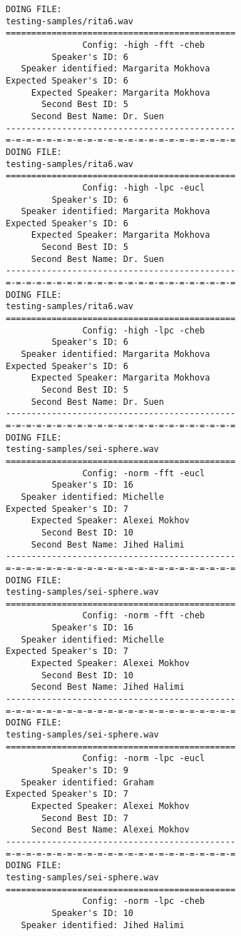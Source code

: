 \begin{verbatim}
DOING FILE:
testing-samples/rita6.wav
=============================================
               Config: -high -fft -cheb
         Speaker's ID: 6
   Speaker identified: Margarita Mokhova
Expected Speaker's ID: 6
     Expected Speaker: Margarita Mokhova
       Second Best ID: 5
     Second Best Name: Dr. Suen
---------------------------------------------
=-=-=-=-=-=-=-=-=-=-=-=-=-=-=-=-=-=-=-=-=-=-=
DOING FILE:
testing-samples/rita6.wav
=============================================
               Config: -high -lpc -eucl
         Speaker's ID: 6
   Speaker identified: Margarita Mokhova
Expected Speaker's ID: 6
     Expected Speaker: Margarita Mokhova
       Second Best ID: 5
     Second Best Name: Dr. Suen
---------------------------------------------
=-=-=-=-=-=-=-=-=-=-=-=-=-=-=-=-=-=-=-=-=-=-=
DOING FILE:
testing-samples/rita6.wav
=============================================
               Config: -high -lpc -cheb
         Speaker's ID: 6
   Speaker identified: Margarita Mokhova
Expected Speaker's ID: 6
     Expected Speaker: Margarita Mokhova
       Second Best ID: 5
     Second Best Name: Dr. Suen
---------------------------------------------
=-=-=-=-=-=-=-=-=-=-=-=-=-=-=-=-=-=-=-=-=-=-=
DOING FILE:
testing-samples/sei-sphere.wav
=============================================
               Config: -norm -fft -eucl
         Speaker's ID: 16
   Speaker identified: Michelle
Expected Speaker's ID: 7
     Expected Speaker: Alexei Mokhov
       Second Best ID: 10
     Second Best Name: Jihed Halimi
---------------------------------------------
=-=-=-=-=-=-=-=-=-=-=-=-=-=-=-=-=-=-=-=-=-=-=
DOING FILE:
testing-samples/sei-sphere.wav
=============================================
               Config: -norm -fft -cheb
         Speaker's ID: 16
   Speaker identified: Michelle
Expected Speaker's ID: 7
     Expected Speaker: Alexei Mokhov
       Second Best ID: 10
     Second Best Name: Jihed Halimi
---------------------------------------------
=-=-=-=-=-=-=-=-=-=-=-=-=-=-=-=-=-=-=-=-=-=-=
DOING FILE:
testing-samples/sei-sphere.wav
=============================================
               Config: -norm -lpc -eucl
         Speaker's ID: 9
   Speaker identified: Graham
Expected Speaker's ID: 7
     Expected Speaker: Alexei Mokhov
       Second Best ID: 7
     Second Best Name: Alexei Mokhov
---------------------------------------------
=-=-=-=-=-=-=-=-=-=-=-=-=-=-=-=-=-=-=-=-=-=-=
DOING FILE:
testing-samples/sei-sphere.wav
=============================================
               Config: -norm -lpc -cheb
         Speaker's ID: 10
   Speaker identified: Jihed Halimi

\end{verbatim}
